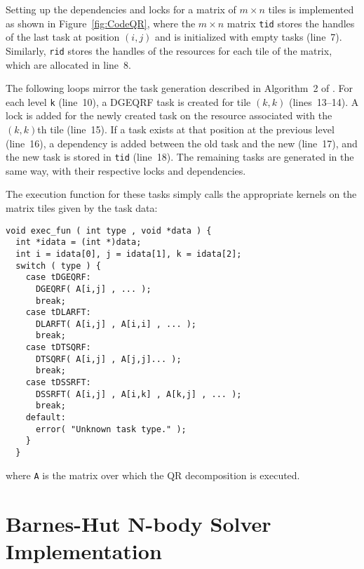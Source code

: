 \documentclass[preprint]{elsarticle}
\newcommand{\fig}[1]
    {Figure~\ref{fig:#1}}
\begin{document}
Setting up the dependencies and locks for a matrix of
$m\times n$ tiles is implemented as shown in \fig{CodeQR},
where the $m\times n$ matrix {\tt tid} stores the handles
of the last task at position $(i,j)$ and is initialized with
empty tasks (line~7).
Similarly, {\tt rid} stores the handles of the resources for each
tile of the matrix, which are allocated in line~8.

The following loops mirror the task generation described in
Algorithm~2 of \cite{ref:Buttari2009}.
For each level {\tt k} (line~10), a DGEQRF task is created
for tile $(k,k)$ (lines~13--14).
A lock is added for the newly created task on the
resource associated with the $(k,k)$th tile (line~15).
If a task exists at that position at the previous level
(line~16), a dependency is added between the old task and
the new (line~17), and the new task is stored in {\tt tid}
(line~18).
The remaining tasks are generated in the same way, with
their respective locks and dependencies.

The execution function for these tasks simply calls the appropriate
kernels on the matrix tiles given by the task data:
\begin{center}\begin{minipage}{0.9\textwidth}
    \begin{lstlisting}
void exec_fun ( int type , void *data ) {
  int *idata = (int *)data;
  int i = idata[0], j = idata[1], k = idata[2];
  switch ( type ) {
    case tDGEQRF:
      DGEQRF( A[i,j] , ... );
      break;
    case tDLARFT:
      DLARFT( A[i,j] , A[i,i] , ... );
      break;
    case tDTSQRF:
      DTSQRF( A[i,j] , A[j,j]... );
      break;
    case tDSSRFT:
      DSSRFT( A[i,j] , A[i,k] , A[k,j] , ... );
      break;
    default:
      error( "Unknown task type." );
    }
  }
    \end{lstlisting}
\end{minipage}\end{center}
\noindent where {\tt A} is the matrix over which the QR
decomposition is executed.


\section{Barnes-Hut N-body Solver Implementation}
\end{document}
